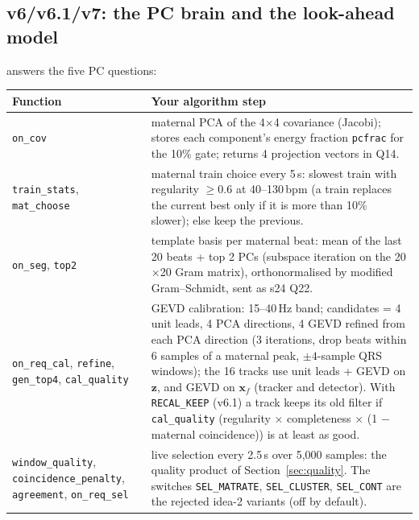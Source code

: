 \documentclass[11pt]{article}
\begin{document}
\subsection{v6/v6.1/v7: the PC brain and the look-ahead model}
 answers the five PC questions:
\begin{center}
\small
\begin{tabularx}{\linewidth}{lX}
\toprule
\textbf{Function} & \textbf{Your algorithm step} \\
\midrule
\texttt{on\_cov} & maternal PCA of the 4$\times$4 covariance (Jacobi); stores each component's energy fraction \texttt{pcfrac} for the 10\% gate; returns 4 projection vectors in Q14. \\
\texttt{train\_stats}, \texttt{mat\_choose} & maternal train choice every 5\,s: slowest train with regularity $\ge 0.6$ at 40--130\,bpm (a train replaces the current best only if it is more than 10\% slower); else keep the previous. \\
\texttt{on\_seg}, \texttt{top2} & template basis per maternal beat: mean of the last 20 beats + top 2 PCs (subspace iteration on the 20$\times$20 Gram matrix), orthonormalised by modified Gram--Schmidt, sent as s24 Q22. \\
\texttt{on\_req\_cal}, \texttt{refine}, \texttt{gen\_top4}, \texttt{cal\_quality} & GEVD calibration: 15--40\,Hz band; candidates = 4 unit leads, 4 PCA directions, 4 GEVD refined from each PCA direction (3 iterations, drop beats within 6 samples of a maternal peak, $\pm 4$-sample QRS windows); the 16 tracks use unit leads + GEVD on $\mathbf{z}$, and GEVD on $\mathbf{x}_f$ (tracker and detector). With \texttt{RECAL\_KEEP} (v6.1) a track keeps its old filter if \texttt{cal\_quality} (regularity $\times$ completeness $\times$ (1 $-$ maternal coincidence)) is at least as good. \\
\texttt{window\_quality}, \texttt{coincidence\_penalty}, \texttt{agreement}, \texttt{on\_req\_sel} & live selection every 2.5\,s over 5,000 samples: the quality product of Section~\ref{sec:quality}. The switches \texttt{SEL\_MATRATE}, \texttt{SEL\_CLUSTER}, \texttt{SEL\_CONT} are the rejected idea-2 variants (off by default). \\
\bottomrule
\end{tabularx}
\end{center}
\end{document}
